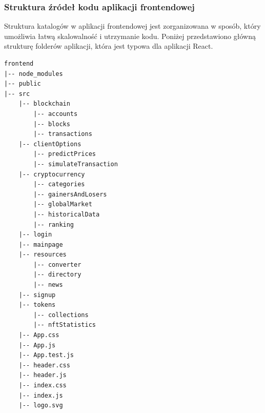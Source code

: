 \subsubsection{Struktura źródeł kodu aplikacji frontendowej}
Struktura katalogów w aplikacji frontendowej jest zorganizowana w sposób, który umożliwia łatwą skalowalność i utrzymanie kodu. Poniżej przedstawiono główną strukturę folderów aplikacji, która jest typowa dla aplikacji React.
\begin{multicols}{2}
\begin{lstlisting}[basicstyle=\footnotesize\ttfamily]
frontend
|-- node_modules
|-- public
|-- src
    |-- blockchain
        |-- accounts
        |-- blocks
        |-- transactions
    |-- clientOptions
        |-- predictPrices
        |-- simulateTransaction
    |-- cryptocurrency
        |-- categories
        |-- gainersAndLosers
        |-- globalMarket
        |-- historicalData
        |-- ranking
    |-- login
    |-- mainpage
    |-- resources
        |-- converter
        |-- directory
        |-- news
    |-- signup
    |-- tokens
        |-- collections
        |-- nftStatistics
    |-- App.css
    |-- App.js
    |-- App.test.js
    |-- header.css
    |-- header.js
    |-- index.css
    |-- index.js
    |-- logo.svg
\end{lstlisting}
\end{multicols}


